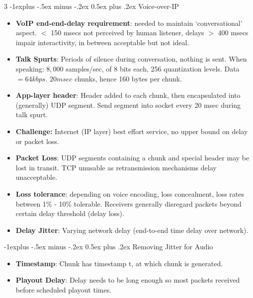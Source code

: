 \documentclass[8pt, a4paper, landscape]{article}
\makeatletter
\renewcommand{\subsection}{\@startsection{subsection}{2}{0.1mm}%
                                {-1explus -.5ex minus -.2ex}%
                                {0.5ex plus .2ex}%
                                {\normalfont\normalsize\bfseries}}
\makeatother
\begin{document}
\begin{multicols*}{3}
\subsection{Voice-over-IP}
\begin{itemize}
\item \textbf{VoIP end-end-delay requirement}: needed to maintain `conversational' aspect. $<$ 150 msecs not perceived by human listener, delays $>$ 400 msecs impair interactivity, in between acceptable but not ideal.
\item \textbf{Talk Spurts}: Periods of silence during conversation, nothing is sent. When speaking: $8,000$ samples/sec, of 8 bits each, 256 quantization levels. Data $= 64kbps$. $20 msec$ chunks, hence 160 bytes per chunk.
\item \textbf{App-layer header}: Header added to each chunk, then encapsulated into (generally) UDP segment. Send segment into socket every 20 msec during talk spurt.
\item \textbf{Challenge:} Internet (IP layer) best effort service, no upper bound on delay or packet loss.
\item \textbf{Packet Loss}: UDP segments containing a chunk and special header may be lost in transit. TCP unusable as retransmission mechanisms delay unacceptable. 
\item \textbf{Loss tolerance}: depending on voice encoding, loss concealment, loss rates between 1\% - 10\% tolerable. Receivers generally disregard packets beyond certain delay threshold (delay loss).
\item \textbf{Delay Jitter}: Varying network delay (end-to-end time delay over network). 
\end{itemize}

\subsection{Removing Jitter for Audio}
\begin{itemize}
\item \textbf{Timestamp}: Chunk has timestamp t, at which chunk is generated.
\item \textbf{Playout Delay}: Delay needs to be long enough so most packets received before scheduled playout times.
\end{itemize}


\end{multicols*}
\end{document}
